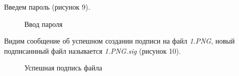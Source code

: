 \documentclass[10pt,a4paper]{report}
\begin{document}
Введем пароль (рисунок 9).
\begin{figure}[h]
	\caption{Ввод пароля}
\end{figure}

Видим сообщение об успешном создании подписи на файл \textit{1.PNG}, новый подписаннный файл называется \textit{1.PNG.sig} (рисунок 10).
\begin{figure}[h]
	\caption{Успешная подпись файла}
\end{figure}
\end{document}

